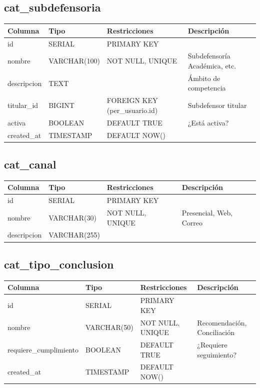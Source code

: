 \documentclass[12pt, a4paper]{article}
\begin{document}
\subsection{cat\_subdefensoria}
\begin{longtable}{|p{3.5cm}|p{2.5cm}|p{3cm}|p{5cm}|}
    \hline
    \rowcolor[gray]{0.9}
    \textbf{Columna} & \textbf{Tipo} & \textbf{Restricciones} & \textbf{Descripción} \\
    \hline
    id & SERIAL & PRIMARY KEY & \\
    \hline
    nombre & VARCHAR(100) & NOT NULL, UNIQUE & Subdefensoría Académica, etc. \\
    \hline
    descripcion & TEXT & & Ámbito de competencia \\
    \hline
    titular\_id & BIGINT & FOREIGN KEY (per\_usuario.id) & Subdefensor titular \\
    \hline
    activa & BOOLEAN & DEFAULT TRUE & ¿Está activa? \\
    \hline
    created\_at & TIMESTAMP & DEFAULT NOW() & \\
    \hline
\end{longtable}

\subsection{cat\_canal}
\begin{longtable}{|p{3.5cm}|p{2.5cm}|p{3cm}|p{5cm}|}
    \hline
    \rowcolor[gray]{0.9}
    \textbf{Columna} & \textbf{Tipo} & \textbf{Restricciones} & \textbf{Descripción} \\
    \hline
    id & SERIAL & PRIMARY KEY & \\
    \hline
    nombre & VARCHAR(30) & NOT NULL, UNIQUE & Presencial, Web, Correo \\
    \hline
    descripcion & VARCHAR(255) & & \\
    \hline
\end{longtable}

\subsection{cat\_tipo\_conclusion}
\begin{longtable}{|p{3.5cm}|p{2.5cm}|p{3cm}|p{5cm}|}
    \hline
    \rowcolor[gray]{0.9}
    \textbf{Columna} & \textbf{Tipo} & \textbf{Restricciones} & \textbf{Descripción} \\
    \hline
    id & SERIAL & PRIMARY KEY & \\
    \hline
    nombre & VARCHAR(50) & NOT NULL, UNIQUE & Recomendación, Conciliación \\
    \hline
    requiere\_cumplimiento & BOOLEAN & DEFAULT TRUE & ¿Requiere seguimiento? \\
    \hline
    created\_at & TIMESTAMP & DEFAULT NOW() & \\
    \hline
\end{longtable}
\end{document}
